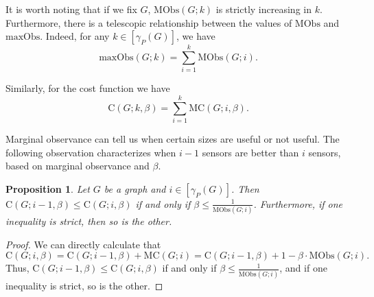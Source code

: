 \documentclass{article}
\newtheorem{proposition}[theorem]{Proposition}
\begin{document}
        It is worth noting that if we fix $G$, $\mathrm{MObs}(G;k)$ is strictly increasing in $k$.
        Furthermore, there is a telescopic relationship between the values of $\mathrm{MObs}$ and $\mathrm{maxObs}$.
        Indeed, for any $k\in [\gamma_P(G)]$, we have
        \begin{equation}\label{equation max obs from marginal obs}
            \mathrm{maxObs}(G;k)=\sum_{i=1}^k \mathrm{MObs}(G;i).
        \end{equation}
        
        Similarly, for the cost function we have
            \[ \mathrm{C}(G;k,\beta)=\sum_{i=1}^k \mathrm{MC}(G;i,\beta). \]
        
        Marginal observance can tell us when certain sizes are useful or not useful.
        The following observation characterizes when $i-1$ sensors are better than $i$ sensors, based on marginal observance and $\beta$.
        
        \begin{proposition}\label{observation marginal cost beta bound on when i-1 is better than i}
            Let $G$ be a graph and $i\in [\gamma_P(G)]$.
            Then $\mathrm{C}(G;i-1,\beta)\leq\mathrm{C}(G;i,\beta)$ if and only if $\beta\leq \frac{1}{\mathrm{MObs}(G;i)}$.
            Furthermore, if one inequality is strict, then so is the other. 
        \end{proposition}
        \begin{proof}
            We can directly calculate that
                \[ \mathrm{C}(G;i,\beta)=\mathrm{C}(G;i-1,\beta)+\mathrm{MC}(G;i)=\mathrm{C}(G;i-1,\beta)+1-\beta\cdot\mathrm{MObs}(G;i). \]
            Thus, $\mathrm{C}(G;i-1,\beta)\leq \mathrm{C}(G;i,\beta)$ if and only if $\beta\leq \frac{1}{\mathrm{MObs}(G;i)}$, and if one inequality is strict, so is the other.
        \end{proof}
        
\end{document}
